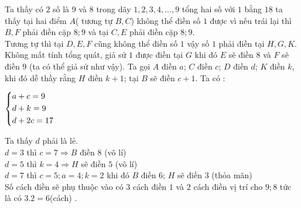 \begin{ex}%
\loigiai  
    {Ta thấy có $2$ số là $9$ và $8$ trong dãy $1,2,3,4,...,9$ tổng hai số với $1$ bằng $18$ ta thấy tại hai điểm $A$( tương tự $B,C$) không thể điền số $1$ được vì nếu trái lại thì $B,F$ phải điền cặp $8;9$ và tại $C,E$ phải điền cặp $8;9$.\\
    	Tương tự thì tại $D,E,F$ cũng không thể điền số $1$ vậy số $1$ phải điền tại $H,G,K$. Không mất tính tổng quát, giả sử $1$ được điền tại $G$ khi đó $E$ sẽ điền $8$ và $F$ sẽ điền $9$ (ta có thể giả sử như vậy). Ta gọi $A$ điền $a$; $C$ điền $c$; $D$ điền $d$; $K$ điền $k$, khi đó dễ thầy rằng $H$ điền $k+1$; tại $B$ sẽ điền $c+1$. Ta có :
    	\begin{center}
    	$\left\{\begin{aligned}&a+c=9\\&d+k=9\\&d+2c=17\end{aligned}\right.$
    	\end{center}
     Ta thấy $d$ phải là lẻ.\\
    	$d=3$ thì $c=7\Rightarrow B$ điền $8$ (vô lí)\\
    	$d=5$ thì $k=4\Rightarrow  H$ sẽ điền $5$ (vô lí)\\
    	$d=7$ thì $c=5;a=4;k=2$ khi đó $B$ điền $6$; $H$ sẽ điền $3$ (thỏa mãn)\\
    	Số cách điền sẽ phụ thuộc vào có $3$ cách điền $1$ và $2$ cách điền vị trí cho $9;8$ tức là có $3.2=6$(cách) .   	
    }
\end{ex}
